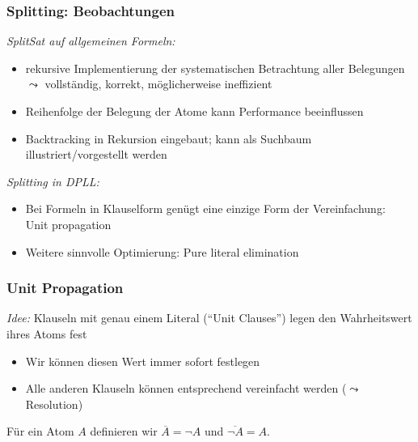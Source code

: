 \documentclass[aspectratio=1610,onlymath]{beamer}
\let\beameroriginaldoublebackslash\\
\let\\=\beameroriginaldoublebackslash
\begin{document}
\begin{frame}\frametitle{Splitting: Beobachtungen}

\emph{SplitSat auf allgemeinen Formeln:}
\begin{itemize}
\item rekursive Implementierung der systematischen Betrachtung aller Belegungen\\
	$\leadsto$ vollständig, korrekt, möglicherweise ineffizient
\item Reihenfolge der Belegung der Atome kann Performance beeinflussen
\item Backtracking in Rekursion eingebaut; kann als Suchbaum illustriert/vorgestellt werden
\end{itemize}\bigskip\pause

\emph{Splitting in DPLL:}
\begin{itemize}
\item Bei Formeln in Klauselform genügt eine einzige Form der Vereinfachung: \\\alert{Unit propagation}
\item Weitere sinnvolle Optimierung: \alert{Pure literal elimination}
\end{itemize}

\end{frame}

\begin{frame}\frametitle{Unit Propagation}

\emph{Idee:} Klauseln mit genau einem Literal ("`Unit Clauses"') legen den Wahrheitswert ihres Atoms fest
\begin{itemize}
\item Wir können diesen Wert immer sofort festlegen
\item Alle anderen Klauseln können entsprechend vereinfacht werden ($\leadsto$ Resolution)
\end{itemize}
\bigskip\pause

Für ein Atom $A$ definieren wir $\overline{A}=\neg A$ und $\overline{\neg A}=A$.\smallskip


\end{frame}
\end{document}
